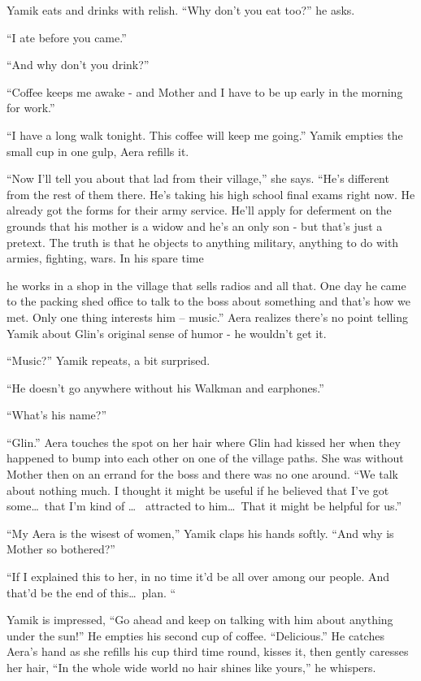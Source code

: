\documentclass[twoside,11pt]{book}
\begin{document}
Yamik eats and drinks with relish. ``Why don't you eat too?'' he asks.

``I ate before you came.''

``And why don't you drink?''

``Coffee keeps me awake - and Mother and I have to be up early in the morning for work.''

``I have a long walk tonight. This coffee will keep me going.'' Yamik empties the small cup in one gulp, Aera refills
it.

``Now I'll tell you about that lad from their village,'' she says. ``He's different from the rest of them there. He's
taking his high school final exams right now. He already got the forms for their army service. He'll apply for
deferment on the grounds that his mother is a widow and he's an only son - but that's just a pretext. The truth is that
he objects to anything military, anything to do with armies, fighting, wars. In his spare time

he works in a shop in the village that sells radios and all that. One day he came to the packing shed office to talk to
the boss about something and that's how we met. Only one thing interests him -- music.'' Aera realizes there's no point
telling Yamik about Glin's original sense of humor - he wouldn't get it.

``Music?'' Yamik repeats, a bit surprised.

 ``He doesn't go anywhere without his Walkman and earphones.''

``What's his name?''

``Glin.'' Aera touches the spot on her hair where Glin had kissed her when they happened to bump into each other on
one of the village paths. She was without Mother then on an errand for the boss and there was no one around. ``We talk
about nothing much. I thought it might be useful if he believed that I've got some\dots\ that I'm kind of \dots\ %
attracted to him\dots\ That it might be helpful for us.''

``My Aera is the wisest of women,'' Yamik claps his hands softly. ``And why is Mother so bothered?''

``If I explained this to her, in no time it'd be all over among our people. And that'd be the end of this\dots\ plan.
``

Yamik is impressed, ``Go ahead and keep on talking with him about anything under the sun!'' He empties his second cup of
coffee. ``Delicious.'' He catches Aera's hand as she refills his cup third time round, kisses it, then gently caresses
her hair, ``In the whole wide world no hair shines like yours,'' he whispers.
\end{document}
